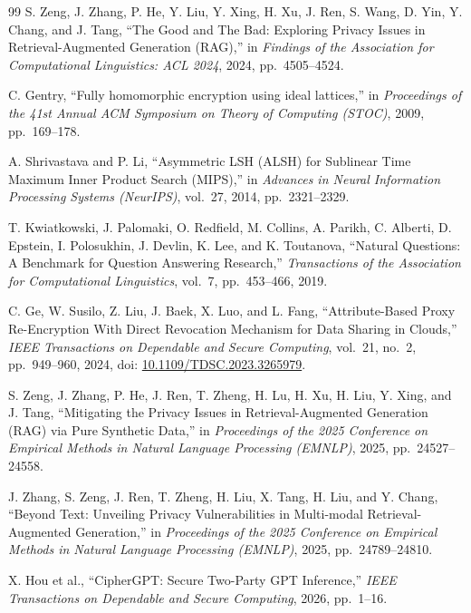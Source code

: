 \documentclass[10pt,a4paper]{article}
\begin{document}
\begin{thebibliography}{99}
 S. Zeng, J. Zhang, P. He, Y. Liu, Y. Xing, H. Xu, J. Ren, S. Wang, D. Yin, Y. Chang, and J. Tang, ``The Good and The Bad: Exploring Privacy Issues in Retrieval-Augmented Generation (RAG),'' in \textit{Findings of the Association for Computational Linguistics: ACL 2024}, 2024, pp.~4505--4524.

 C. Gentry, ``Fully homomorphic encryption using ideal lattices,'' in \textit{Proceedings of the 41st Annual ACM Symposium on Theory of Computing (STOC)}, 2009, pp.~169--178.

 A. Shrivastava and P. Li, ``Asymmetric LSH (ALSH) for Sublinear Time Maximum Inner Product Search (MIPS),'' in \textit{Advances in Neural Information Processing Systems (NeurIPS)}, vol.~27, 2014, pp.~2321--2329.

 T. Kwiatkowski, J. Palomaki, O. Redfield, M. Collins, A. Parikh, C. Alberti, D. Epstein, I. Polosukhin, J. Devlin, K. Lee, and K. Toutanova, ``Natural Questions: A Benchmark for Question Answering Research,'' \textit{Transactions of the Association for Computational Linguistics}, vol.~7, pp.~453--466, 2019.

 C. Ge, W. Susilo, Z. Liu, J. Baek, X. Luo, and L. Fang, ``Attribute-Based Proxy Re-Encryption With Direct Revocation Mechanism for Data Sharing in Clouds,'' \textit{IEEE Transactions on Dependable and Secure Computing}, vol.~21, no.~2, pp.~949--960, 2024, doi: \href{https://doi.org/10.1109/TDSC.2023.3265979}{10.1109/TDSC.2023.3265979}.

 S. Zeng, J. Zhang, P. He, J. Ren, T. Zheng, H. Lu, H. Xu, H. Liu, Y. Xing, and J. Tang, ``Mitigating the Privacy Issues in Retrieval-Augmented Generation (RAG) via Pure Synthetic Data,'' in \textit{Proceedings of the 2025 Conference on Empirical Methods in Natural Language Processing (EMNLP)}, 2025, pp.~24527--24558.

 J. Zhang, S. Zeng, J. Ren, T. Zheng, H. Liu, X. Tang, H. Liu, and Y. Chang, ``Beyond Text: Unveiling Privacy Vulnerabilities in Multi-modal Retrieval-Augmented Generation,'' in \textit{Proceedings of the 2025 Conference on Empirical Methods in Natural Language Processing (EMNLP)}, 2025, pp.~24789--24810.

 X. Hou et al., ``CipherGPT: Secure Two-Party GPT Inference,'' \textit{IEEE Transactions on Dependable and Secure Computing}, 2026, pp.~1--16.


\end{thebibliography}
\end{document}
